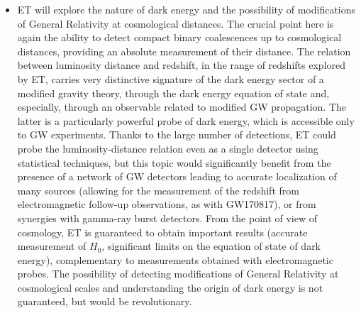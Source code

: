 \begin{itemize}
\vspace{1mm}

\item ET will explore the nature of dark energy and the possibility of modifications of General Relativity at cosmological distances. The crucial point here is again the ability to detect compact binary coalescences up to cosmological distances, providing an absolute measurement of their distance. The relation between luminosity distance and redshift, in the range of redshifts explored by  ET, carries very distinctive signature of the dark energy sector of a modified gravity theory, through the dark energy equation of state and, especially, through  an observable related to modified GW propagation. The latter is a particularly powerful probe of dark energy, which is accessible only to GW experiments. Thanks to the large number of detections, ET could probe the luminosity-distance relation even as a single detector using statistical techniques, but this topic would significantly benefit from the presence of a network of GW detectors leading to accurate localization of many sources (allowing for  the measurement of the redshift from electromagnetic follow-up observations, as with GW170817), or from synergies with gamma-ray burst detectors. From the point of view of cosmology, ET is guaranteed to obtain  important results (accurate measurement of $H_0$, significant limits on the equation of state of dark energy), complementary to measurements obtained with electromagnetic probes. The possibility of detecting  modifications of General Relativity at cosmological scales and understanding the origin of dark energy is not guaranteed, but would be revolutionary.

\vspace{1mm}


\end{itemize}
